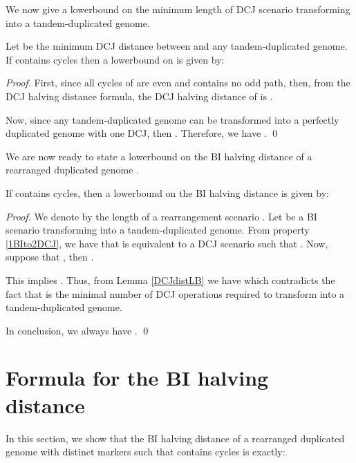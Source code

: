 \documentclass{llncs}
\begin{document}
We now give a lowerbound on the minimum length of DCJ scenario transforming 
 into a tandem-duplicated genome.

\begin{lemma}
    Let   be the minimum DCJ distance between  and any 
   tandem-duplicated genome. If  contains  cycles then a 
   lowerbound on  is given by:
    
\label{DCJdistLB}
\end{lemma}


\begin{proof}
    First, since all cycles  of  are even and  contains no odd 
    path, 
   then, from the DCJ halving distance formula, the DCJ halving distance of 
      is .

    Now, since any  tandem-duplicated genome can be transformed into 
    a perfectly duplicated genome with one DCJ, then . Therefore, we have .  \qed
\end{proof}

We are now ready to state a lowerbound on the BI halving distance of a rearranged duplicated genome .

\begin{theorem}
    If  contains  cycles, then a lowerbound on the BI halving distance
    is given by: 

\end{theorem}

\begin{proof}

We denote by  the length of a rearrangement scenario .
   Let  be a BI scenario transforming  into a
   tandem-duplicated genome.
    From property \ref{1BIto2DCJ}, we have that  is equivalent to
    a DCJ scenario  such that  . 
    Now, suppose that , then .
    
    This implies . Thus, from Lemma 
   \ref{DCJdistLB} we have  
    which contradicts the fact that  is the minimal number
    of DCJ
    operations required to transform  into a tandem-duplicated genome.

    In conclusion, we always have .  \qed
\end{proof}



\section{Formula for the BI halving distance}
\label{sec:dist}

In this section, we show that the BI halving distance of a rearranged duplicated genome  with  distinct markers such that   contains  cycles is exactly:
\end{document}
